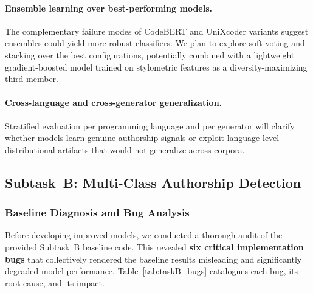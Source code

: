 \documentclass[11pt]{article}
\begin{document}
\paragraph{Ensemble learning over best-performing models.}
The complementary failure modes of CodeBERT and UniXcoder variants suggest ensembles could yield more robust classifiers. We plan to explore soft-voting and stacking over the best configurations, potentially combined with a lightweight gradient-boosted model trained on stylometric features as a diversity-maximizing third member.

\paragraph{Cross-language and cross-generator generalization.}
Stratified evaluation per programming language and per generator will clarify whether models learn genuine authorship signals or exploit language-level distributional artifacts that would not generalize across corpora.

\subsection{Subtask~B: Multi-Class Authorship Detection}

\subsubsection{Baseline Diagnosis and Bug Analysis}
\label{sec:taskB_diagnosis}

Before developing improved models, we conducted a thorough audit of the provided Subtask~B baseline code. This revealed \textbf{six critical implementation bugs} that collectively rendered the baseline results misleading and significantly degraded model performance. Table~\ref{tab:taskB_bugs} catalogues each bug, its root cause, and its impact.
\end{document}
